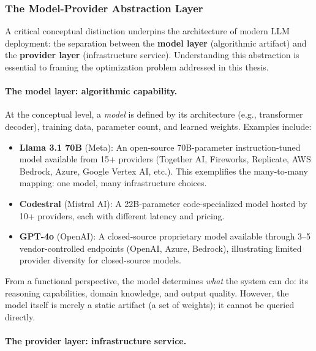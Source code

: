 \documentclass[english]{article}
\begin{document}
\subsubsection{The Model-Provider Abstraction Layer}

A critical conceptual distinction underpins the architecture of modern LLM deployment: the separation between the \textbf{model layer} (algorithmic artifact) and the \textbf{provider layer} (infrastructure service). Understanding this abstraction is essential to framing the optimization problem addressed in this thesis.

\paragraph{The model layer: algorithmic capability.}

At the conceptual level, a \textit{model} is defined by its architecture (e.g., transformer decoder), training data, parameter count, and learned weights. Examples include:
\begin{itemize}
    \item \textbf{Llama 3.1 70B} (Meta): An open-source 70B-parameter instruction-tuned model \parencite{llama3_2024} available from 15+ providers (Together AI, Fireworks, Replicate, AWS Bedrock, Azure, Google Vertex AI, etc.). This exemplifies the many-to-many mapping: one model, many infrastructure choices.

    \item \textbf{Codestral} (Mistral AI): A 22B-parameter code-specialized model \parencite{mistral_codestral} hosted by 10+ providers, each with different latency and pricing.

    \item \textbf{GPT-4o} (OpenAI): A closed-source proprietary model \parencite{gpt4_technical_report} available through 3--5 vendor-controlled endpoints (OpenAI, Azure, Bedrock), illustrating limited provider diversity for closed-source models.
\end{itemize}

From a functional perspective, the model determines \emph{what} the system can do: its reasoning capabilities, domain knowledge, and output quality. However, the model itself is merely a static artifact (a set of weights); it cannot be queried directly.

\paragraph{The provider layer: infrastructure service.}
\end{document}
